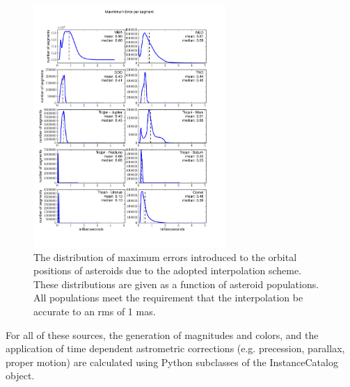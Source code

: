 \documentclass[11pt]{article}
\begin{document}
\begin{figure}[h]
\centering
\includegraphics[width=0.65\textwidth]{validation_figures/ErrorHistogramsLinear.pdf}
\caption{The distribution of maximum errors introduced to the orbital
  positions of asteroids due to the adopted interpolation
  scheme. These distributions are given as a function of asteroid
  populations. All populations meet the requirement that the
  interpolation be accurate to an rms of 1 mas.}
\label{fig:asteroid}
\end{figure}



For all of these sources, the generation of magnitudes and colors, and
the application of time dependent astrometric corrections (e.g.
precession, parallax, proper motion) are calculated using Python
subclasses of the InstanceCatalog object.
\end{document}
